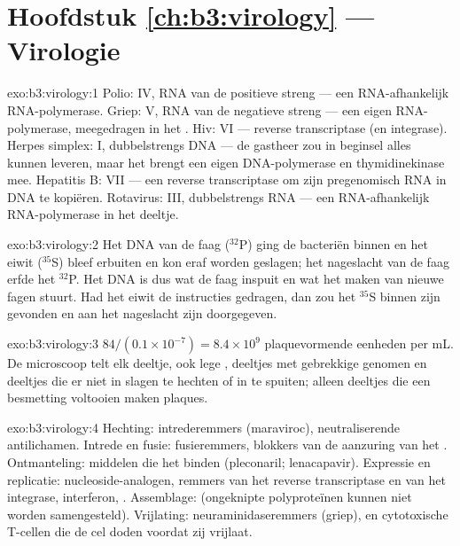 \section*{Hoofdstuk \ref{ch:b3:virology} --- Virologie}

\begin{solution}{exo:b3:virology:1}
Polio: IV, RNA van de positieve streng --- een RNA-afhankelijk
RNA-polymerase. Griep: V, RNA van de negatieve streng --- een eigen
RNA-polymerase, meegedragen in het . Hiv: VI --- reverse
transcriptase (en integrase). Herpes simplex: I, dubbelstrengs DNA ---
de gastheer zou in beginsel alles kunnen leveren, maar het  brengt
een eigen DNA-polymerase en thymidinekinase mee. Hepatitis B: VII ---
een reverse transcriptase om zijn pregenomisch RNA in DNA te
kopiëren. Rotavirus: III, dubbelstrengs RNA --- een RNA-afhankelijk
RNA-polymerase in het deeltje.
\end{solution}

\begin{solution}{exo:b3:virology:2}
Het DNA van de faag ($^{32}$P) ging de bacteriën binnen en het eiwit
($^{35}$S) bleef erbuiten en kon eraf worden geslagen; het nageslacht
van de faag erfde het $^{32}$P. Het DNA is dus wat de faag inspuit en
wat het maken van nieuwe fagen stuurt. Had het eiwit de instructies
gedragen, dan zou het $^{35}$S binnen zijn gevonden en aan het
nageslacht zijn doorgegeven.
\end{solution}

\begin{solution}{exo:b3:virology:3}
$84/(0.1\times 10^{-7}) = 8.4\times 10^{9}$ plaquevormende eenheden per
mL. De microscoop telt elk deeltje, ook lege , deeltjes met
gebrekkige genomen en deeltjes die er niet in slagen te hechten of in te
spuiten; alleen deeltjes die een besmetting voltooien maken plaques.
\end{solution}

\begin{solution}{exo:b3:virology:4}
Hechting: intrederemmers (maraviroc), neutraliserende antilichamen.
Intrede en fusie: fusieremmers, blokkers van de aanzuring van het
. Ontmanteling: middelen die het  binden (pleconaril;
lenacapavir). Expressie en replicatie: nucleoside-analogen, remmers van
het reverse transcriptase en van het integrase, interferon,
. Assemblage:  (ongeknipte
polyproteïnen kunnen niet worden samengesteld). Vrijlating:
neuraminidaseremmers (griep), en cytotoxische T-cellen die de cel doden
voordat zij vrijlaat.
\end{solution}

